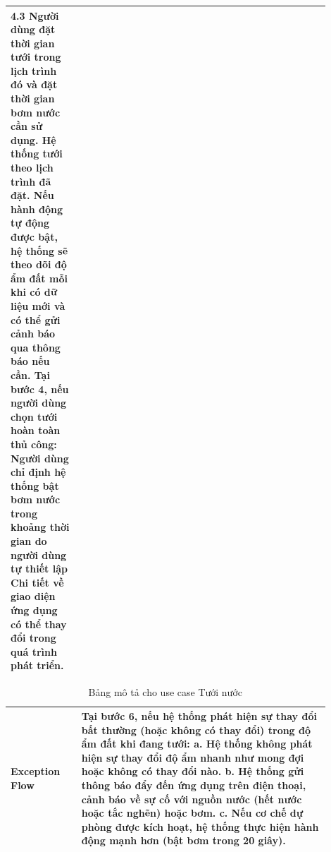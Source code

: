 \begin{table}[H]
\begin{tabular}{|p{0.2\linewidth}|p{0.7\linewidth}|}
    4.3 Người dùng đặt thời gian tưới trong lịch trình đó và đặt thời gian bơm nước cần sử dụng. \newline
    4.4 Hệ thống tưới theo lịch trình đã đặt. Nếu hành động tự động được bật, hệ thống sẽ theo dõi độ ẩm đất mỗi khi có dữ liệu mới và có thể gửi cảnh báo qua thông báo nếu cần. \newline
    Tại bước 4, nếu người dùng chọn tưới hoàn toàn thủ công:\newline
    4.1 Người dùng chỉ định hệ thống bật bơm nước trong khoảng thời gian do người dùng tự thiết lập
    Chi tiết về giao diện ứng dụng có thể thay đổi trong quá trình phát triển.
 \\ \hline
\end{tabular}
\end{table}

\begin{table}[H]
\begin{tabular}{|p{0.2\linewidth}|p{0.7\linewidth}|}
    \hline
    Exception Flow          & 
        Tại bước 6, nếu hệ thống phát hiện sự thay đổi bất thường (hoặc không có thay đổi) trong độ ẩm đất khi đang tưới: \newline
        a. Hệ thống không phát hiện sự thay đổi độ ẩm nhanh như mong đợi hoặc không có thay đổi nào. \newline
        b. Hệ thống gửi thông báo đẩy đến ứng dụng trên điện thoại, cảnh báo về sự cố với nguồn nước (hết nước hoặc tắc nghẽn) hoặc bơm. \newline
        c. Nếu cơ chế dự phòng được kích hoạt, hệ thống thực hiện hành động mạnh hơn (bật bơm trong 20 giây). 
    \\ \hline
    \end{tabular}
\caption{Bảng mô tả cho use case Tưới nước}
\end{table}



